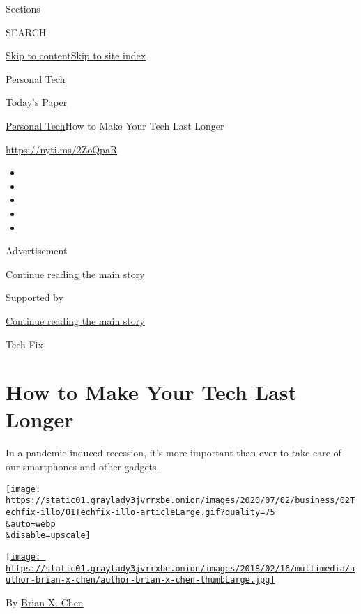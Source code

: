 Sections

SEARCH

\protect\hyperlink{site-content}{Skip to
content}\protect\hyperlink{site-index}{Skip to site index}

\href{https://www.nytimes3xbfgragh.onion/section/technology/personaltech}{Personal
Tech}

\href{https://myaccount.nytimes3xbfgragh.onion/auth/login?response_type=cookie\&client_id=vi}{}

\href{https://www.nytimes3xbfgragh.onion/section/todayspaper}{Today's
Paper}

\href{/section/technology/personaltech}{Personal Tech}\textbar{}How to
Make Your Tech Last Longer

\url{https://nyti.ms/2ZoQpaR}

\begin{itemize}
\item
\item
\item
\item
\item
\end{itemize}

Advertisement

\protect\hyperlink{after-top}{Continue reading the main story}

Supported by

\protect\hyperlink{after-sponsor}{Continue reading the main story}

Tech Fix

\hypertarget{how-to-make-your-tech-last-longer}{%
\section{How to Make Your Tech Last
Longer}\label{how-to-make-your-tech-last-longer}}

In a pandemic-induced recession, it's more important than ever to take
care of our smartphones and other gadgets.

\texttt{[image: https://static01.graylady3jvrrxbe.onion/images/2020/07/02/business/02Techfix-illo/01Techfix-illo-articleLarge.gif?quality=75\\\&auto=webp\\\&disable=upscale]}

\href{https://www.nytimes3xbfgragh.onion/by/brian-x-chen}{\texttt{[image: https://static01.graylady3jvrrxbe.onion/images/2018/02/16/multimedia/author-brian-x-chen/author-brian-x-chen-thumbLarge.jpg]}}

By \href{https://www.nytimes3xbfgragh.onion/by/brian-x-chen}{Brian X.
Chen}

